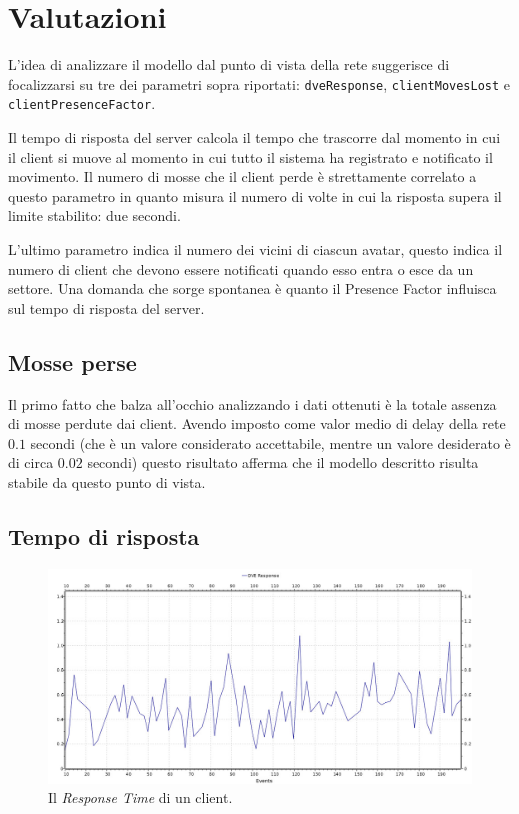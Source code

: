 \documentclass[a4paper, 11pt, oneside]{book}
\theoremstyle{definition}
\theoremstyle{remark}
\begin{document}
\section{Valutazioni}
L'idea di analizzare il modello dal punto di vista della rete suggerisce di
focalizzarsi su tre dei parametri sopra riportati: \texttt{dveResponse},
\texttt{clientMovesLost} e \texttt{clientPresenceFactor}.

Il tempo di risposta del server calcola il tempo che trascorre dal momento in
cui il client si muove al momento in cui tutto il sistema ha registrato e
notificato il movimento. Il numero di mosse che il client perde è strettamente
correlato a questo parametro in quanto misura il numero di volte in cui
la risposta supera il limite stabilito: due secondi.

L'ultimo parametro indica il numero dei vicini di ciascun avatar, questo
indica il numero di client che devono essere notificati quando esso
entra o esce da un settore. Una domanda che sorge spontanea è quanto il
Presence Factor influisca sul tempo di risposta del server.

\subsection{Mosse perse}
Il primo fatto che balza all'occhio analizzando i dati ottenuti è la totale
assenza di mosse perdute dai client. Avendo imposto come valor medio di delay
della rete $0.1$ secondi (che è un valore considerato accettabile, mentre un
valore desiderato è di circa $0.02$ secondi) questo risultato afferma che il
modello descritto risulta stabile da questo punto di vista.

\subsection{Tempo di risposta}

\begin{figure}
\begin{center}
\includegraphics[scale=0.4]{response.jpeg}
\end{center}
\caption{Il \emph{Response Time} di un client.}
\label{response}
\end{figure}
\end{document}

